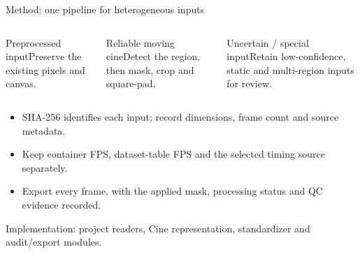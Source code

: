 \documentclass[aspectratio=169,10pt]{beamer}
\newcommand{\source}[1]{\par\vfill{\fontsize{6.1}{8}\selectfont\color{Muted}#1\par}}
\begin{document}
\begin{frame}[t]{Method: one pipeline for heterogeneous inputs}
  \begin{center}
  \end{center}
  \begin{columns}[T,onlytextwidth]
    \begin{block}{Preprocessed input}\small Preserve the existing pixels and canvas.\end{block}
    \begin{block}{Reliable moving cine}\small Detect the region, then mask, crop and square-pad.\end{block}
    \begin{block}{Uncertain / special input}\small Retain low-confidence, static and multi-region inputs for review.\end{block}
  \end{columns}
  \vspace{3pt}\small
  \begin{itemize}\setlength{\itemsep}{4pt}
    \item SHA-256 identifies each input; record dimensions, frame count and source metadata.
    \item Keep container FPS, dataset-table FPS and the selected timing source separately.
    \item Export every frame, with the applied mask, processing status and QC evidence recorded.
  \end{itemize}
  \source{Implementation: project readers, Cine representation, standardizer and audit/export modules.}
\end{frame}
\end{document}
